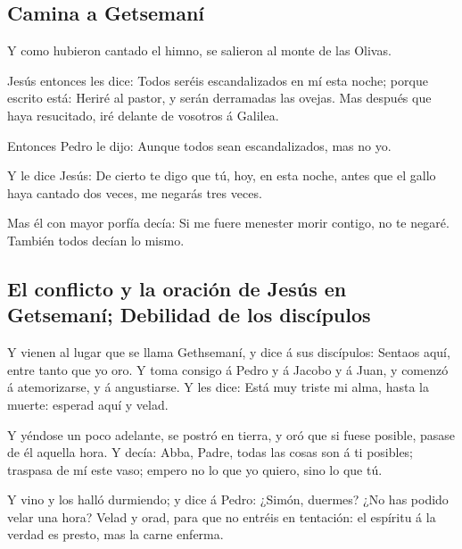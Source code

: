 \hypertarget{camina-a-getsemanuxed}{%
\subsection{Camina a Getsemaní}\label{camina-a-getsemanuxed}}

 Y como hubieron cantado el himno, se salieron al monte
de las Olivas.

 Jesús entonces les dice: Todos seréis escandalizados en
mí esta noche; porque escrito está: Heriré al pastor, y serán derramadas
las ovejas.  Mas después que haya resucitado, iré delante
de vosotros á Galilea.

 Entonces Pedro le dijo: Aunque todos sean
escandalizados, mas no yo.

 Y le dice Jesús: De cierto te digo que tú, hoy, en esta
noche, antes que el gallo haya cantado dos veces, me negarás tres veces.

 Mas él con mayor porfía decía: Si me fuere menester
morir contigo, no te negaré. También todos decían lo mismo.

\hypertarget{el-conflicto-y-la-oraciuxf3n-de-jesuxfas-en-getsemanuxed-debilidad-de-los-discuxedpulos}{%
\subsection{El conflicto y la oración de Jesús en Getsemaní; Debilidad
de los
discípulos}\label{el-conflicto-y-la-oraciuxf3n-de-jesuxfas-en-getsemanuxed-debilidad-de-los-discuxedpulos}}

 Y vienen al lugar que se llama Gethsemaní, y dice á sus
discípulos: Sentaos aquí, entre tanto que yo oro.  Y toma
consigo á Pedro y á Jacobo y á Juan, y comenzó á atemorizarse, y á
angustiarse.  Y les dice: Está muy triste mi alma, hasta
la muerte: esperad aquí y velad.

 Y yéndose un poco adelante, se postró en tierra, y oró
que si fuese posible, pasase de él aquella hora.  Y
decía: Abba, Padre, todas las cosas son á ti posibles; traspasa de mí
este vaso; empero no lo que yo quiero, sino lo que tú.

 Y vino y los halló durmiendo; y dice á Pedro: ¿Simón,
duermes? ¿No has podido velar una hora?  Velad y orad,
para que no entréis en tentación: el espíritu á la verdad es presto, mas
la carne enferma.

